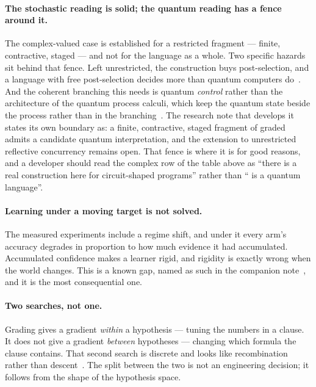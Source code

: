 \paragraph{The stochastic reading is solid; the quantum reading has a fence
around it.} The complex-valued case is established for a restricted fragment ---
finite, contractive, staged --- and not for the language as a whole. Two
specific hazards sit behind that fence. Left unrestricted, the construction
buys post-selection, and a language with free post-selection decides more than
quantum computers do~\cite{Aaronson05}. And the coherent branching this needs
is quantum \emph{control} rather than the architecture of the quantum process
calculi, which keep the quantum state beside the process rather than in the
branching~\cite{GayNagarajan05,YingYuFeng14,BadescuPanangaden15}. The
research note that develops it~\cite{GWQuantum} states its own boundary as: a finite, contractive,
staged fragment of graded \rhoc{} admits a candidate quantum interpretation, and
the extension to unrestricted reflective concurrency remains open. That fence is
where it is for good reasons, and a developer should read the complex row of the
table above as ``there is a real construction here for circuit-shaped programs''
rather than ``\flang{} is a quantum language''.

\paragraph{Learning under a moving target is not solved.} The measured
experiments include a regime shift, and under it every arm's accuracy degrades
in proportion to how much evidence it had accumulated. Accumulated confidence
makes a learner rigid, and rigidity is exactly wrong when the world changes.
This is a known gap, named as such in the companion note~\cite{GWPLN}, and it is the most
consequential one.

\paragraph{Two searches, not one.} Grading gives a gradient \emph{within} a
hypothesis --- tuning the numbers in a clause. It does not give a gradient
\emph{between} hypotheses --- changing which formula the clause contains. That
second search is discrete and looks like recombination rather than
descent~\cite{ComposeNote}. The
split between the two is not an engineering decision; it follows from the shape
of the hypothesis space.
